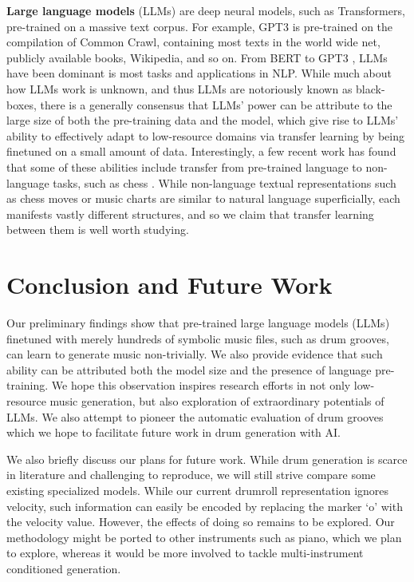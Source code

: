 \documentclass[letterpaper]{article} %
\begin{document}
\textbf{Large language models} (LLMs) are deep neural models, such as Transformers, pre-trained on a massive text corpus. For example, GPT3 is pre-trained on the compilation of Common Crawl, containing most texts in the world wide net, publicly available books, Wikipedia, and so on. From BERT \cite{devlin-etal-2019-bert} to GPT3 \cite{NEURIPS2020_1457c0d6}, LLMs have been dominant is most tasks and applications in NLP. While much about how LLMs work is unknown, and thus LLMs are notoriously known as black-boxes, there is a generally consensus that LLMs' power can be attribute to the large size of both the pre-training data and the model, which give rise to LLMs' ability to effectively adapt to low-resource domains via transfer learning by being finetuned on a small amount of data. Interestingly, a few recent work has found that some of these abilities include transfer from pre-trained language to non-language tasks, such as chess \cite{stockl-2021-watching}. While non-language textual representations such as chess moves or music charts are similar to natural language superficially, each manifests vastly different structures, and so we claim that transfer learning between them is well worth studying.

\vspace{-0.75mm}
\section{Conclusion and Future Work}
Our preliminary findings show that pre-trained large language models (LLMs) finetuned with merely hundreds of symbolic music files, such as drum grooves, can learn to generate music non-trivially. We also provide evidence that such ability can be attributed both the model size and the presence of language pre-training. We hope this observation inspires research efforts in not only low-resource music generation, but also exploration of extraordinary potentials of LLMs. We also attempt to pioneer the automatic evaluation of drum grooves which we hope to facilitate future work in drum generation with AI.

We also briefly discuss our plans for future work. While drum generation is scarce in literature and challenging to reproduce, we will still strive compare some existing specialized models. While our current drumroll representation ignores velocity, such information can easily be encoded by replacing the marker `o' with the velocity value. However, the effects of doing so remains to be explored. Our methodology might be ported to other instruments such as piano, which we plan to explore, whereas it would be more involved to tackle multi-instrument conditioned generation.
\end{document}
